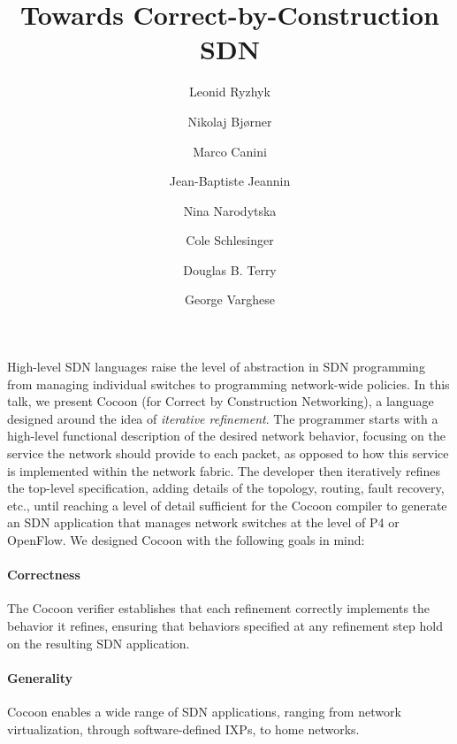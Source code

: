 \documentclass[letterpaper,10pt,twocolumn]{article}
\begin{document}
\title{\vspace{-3cm}Towards Correct-by-Construction SDN}

\author[1]{Leonid Ryzhyk}
\author[2]{Nikolaj Bj{\o}rner}
\author[3]{Marco Canini}
\author[1]{Jean-Baptiste Jeannin}
\author[1]{Nina Narodytska}
\author[1]{Cole Schlesinger}
\author[1]{Douglas B. Terry}
\author[2]{George Varghese}


\date{}
\maketitle

High-level SDN languages raise the level of abstraction in SDN 
programming from managing individual switches to programming 
network-wide policies.  In this talk, we present Cocoon (for 
Correct by Construction Networking), a language designed around 
the idea of \emph{iterative refinement}.  The programmer starts 
with a high-level functional description of the desired network 
behavior, focusing on the service the network should provide to 
each packet, as opposed to how this service is implemented within 
the network fabric.  The developer then iteratively refines the 
top-level specification, adding details of the topology, routing, 
fault recovery, etc., until reaching a level of detail sufficient 
for the Cocoon compiler to generate an SDN application that 
manages network switches at the level of P4 or OpenFlow.  We 
designed Cocoon with the following goals in mind:

\paragraph{Correctness} The Cocoon verifier establishes that each 
refinement correctly implements the behavior it refines, ensuring 
that behaviors specified at any refinement step hold on the 
resulting SDN application.


\paragraph{Generality} Cocoon enables a wide range of SDN 
applications, ranging from network virtualization, through 
software-defined IXPs, to home networks. 
\end{document}
